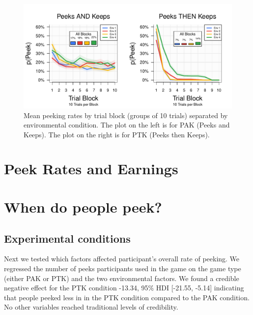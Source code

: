 \documentclass[a4paper,doc,natbib,floatsintext]{apa6}\usepackage[]{graphicx}\usepackage[]{color}
\begin{document}





\begin{figure}
\includegraphics[width=\columnwidth]{figures/peekrates.pdf}
\caption{Mean peeking rates by trial block (groups of 10 trials) separated by environmental condition. The plot on the left is for PAK (Peeks and Keeps). The plot on the right is for PTK (Peeks then Keeps).}
\label{fig:peekstime}
\end{figure}



\section{Peek Rates and Earnings}



\section{When do people peek?}

\subsection{Experimental conditions}




Next we tested which factors affected participant's overall rate of peeking. We regressed the number of peeks participants used in the game on the game type (either PAK or PTK) and the two environmental factors. We found a credible negative effect for the PTK condition -13.34, 95\% HDI [-21.55, -5.14] indicating that people peeked less in in the PTK condition compared to the PAK condition. No other variables reached traditional levels of credibility.
\end{document}
